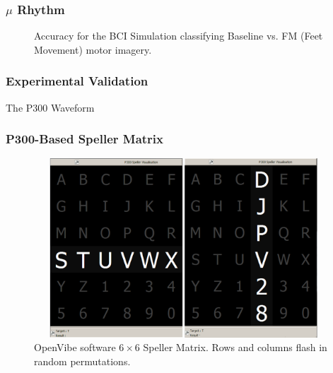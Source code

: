 \documentclass[aspectratio=169]{beamer}
\begin{document}
	
	\begin{frame}
	\frametitle{$\mu$ Rhythm}
   \begin{figure}[thpb]
      \centering
      \setlength\fboxsep{0pt}
	  \setlength\fboxrule{0.5pt}
      \caption{\centering Accuracy for the BCI Simulation classifying Baseline vs. FM (Feet Movement) motor imagery.}
      \label{figure3}
   \end{figure} 	
	\end{frame}	  
	    
\begin{frame}
\frametitle{Experimental Validation}
\begin{center}
\LARGE The P300 Waveform
\end{center}
\end{frame}

\begin{frame}
\frametitle{P300-Based Speller Matrix}
\begin{figure}[h!]
\centering
\includegraphics[width=12.5cm,height=6.7cm]{images/openvibep300matrix.png}
\caption{OpenVibe software $6 \times 6$ Speller Matrix.  Rows and columns flash in random permutations.}
\label{fig:p300matrix}
\end{figure}
\end{frame}    
\end{document}
